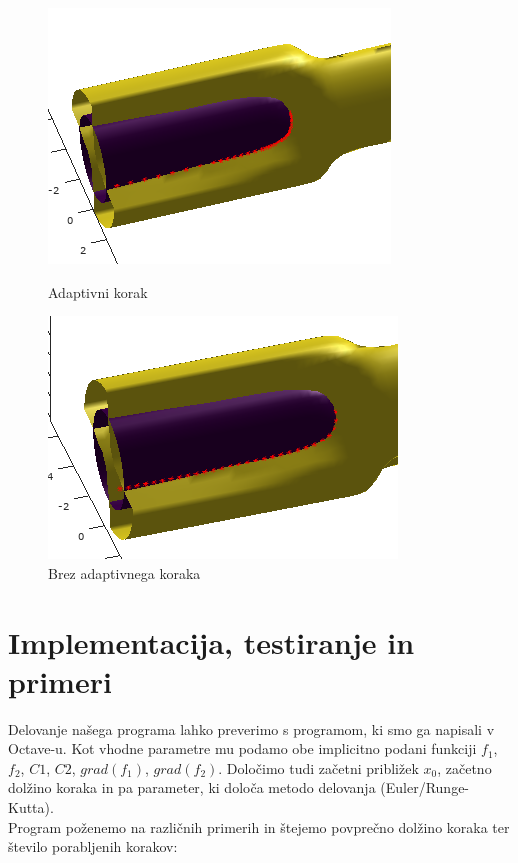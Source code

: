 \documentclass[12pt]{article}
\begin{document}
	\begin{figure}[H]
		\centering
		\begin{minipage}{.5\textwidth}
			\centering
			\includegraphics[scale=0.50]{slikaAda}
			\caption{Adaptivni korak}
			\label{slika:slikaAda}
		\end{minipage}%
		\begin{minipage}{.5\textwidth}
			\centering
			\includegraphics[scale=0.50]{slikaAda2}
			\caption{Brez adaptivnega koraka}
			\label{slika:slikaAda2}
		\end{minipage}
	\end{figure}		
	
	\section{Implementacija, testiranje in primeri}
	Delovanje našega programa lahko preverimo s programom, ki smo ga napisali v Octave-u. Kot vhodne parametre mu podamo obe implicitno podani funkciji $f_{1}$, $f_{2}$, $C1$, $C2$, $grad(f_{1})$, $grad(f_{2})$. Določimo tudi začetni približek $x_{0}$, začetno dolžino koraka in pa parameter, ki določa metodo delovanja (Euler/Runge-Kutta).\\
	Program poženemo na različnih primerih in štejemo povprečno dolžino koraka ter število porabljenih korakov:\\\\
	
\end{document}
